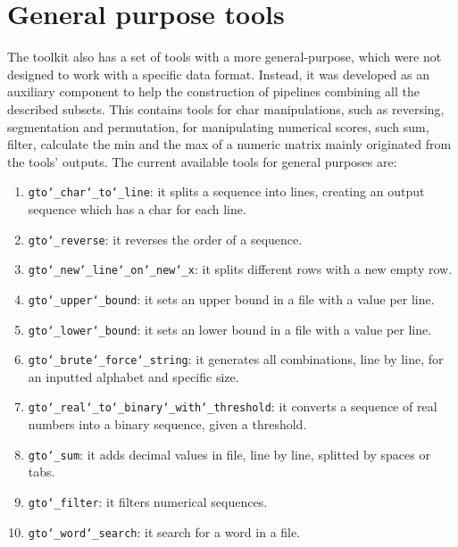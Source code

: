 \chapter{General purpose tools}
\label{seq}
The toolkit also has a set of tools with a more general-purpose, which were not designed to work with a specific data format. Instead, it was developed as an auxiliary component to help the construction of pipelines combining all the described subsets. This contains tools for char manipulations, such as reversing, segmentation and permutation, for manipulating numerical scores, such sum, filter, calculate the min and the max of a numeric matrix mainly originated from the tools' outputs. The current available tools for general purposes are:
\begin{enumerate}

\item \texttt{gto\char`_char\char`_to\char`_line}: it splits a sequence into lines, creating an output sequence which has a char for each line.

\item \texttt{gto\char`_reverse}: it reverses the order of a sequence.

\item \texttt{gto\char`_new\char`_line\char`_on\char`_new\char`_x}: it splits different rows with a new empty row.

\item \texttt{gto\char`_upper\char`_bound}: it sets an upper bound in a file with a value per line.

\item \texttt{gto\char`_lower\char`_bound}: it sets an lower bound in a file with a value per line.

\item \texttt{gto\char`_brute\char`_force\char`_string}: it generates all combinations, line by line, for an inputted alphabet and specific size.

\item \texttt{gto\char`_real\char`_to\char`_binary\char`_with\char`_threshold}: it converts a sequence of real numbers into a binary sequence, given a threshold.

\item \texttt{gto\char`_sum}: it adds decimal values in file, line by line, splitted by spaces or tabs.

\item \texttt{gto\char`_filter}: it filters numerical sequences.

\item \texttt{gto\char`_word\char`_search}: it search for a word in a file.


\end{enumerate}
